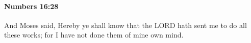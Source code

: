 
		\paragraph{Numbers 16:28} %
			\label{NUMBERS-16-28}

			And Moses said, Hereby ye shall know that the LORD hath sent me to do all these works; for I have not done them of mine own mind.


